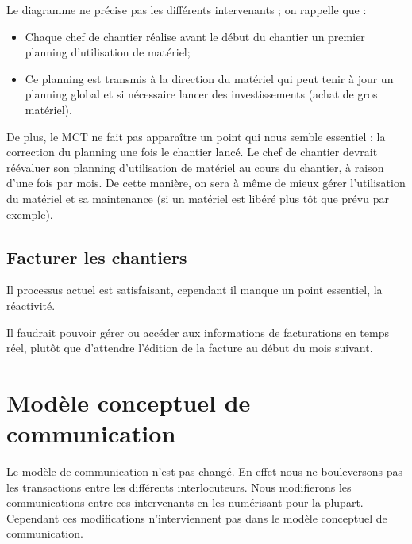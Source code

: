 \documentclass[twoside]{article}
\begin{document}
Le diagramme ne précise pas les différents intervenants ; on rappelle que :
\begin{itemize}
\item Chaque chef de chantier réalise avant le début du chantier un premier
planning d'utilisation de matériel;
\item Ce planning est transmis à la direction du matériel qui peut tenir à
jour un planning global et si nécessaire lancer des investissements (achat
de gros matériel).
\end{itemize}

\vskip 6pt

De plus, le MCT ne fait pas apparaître un point qui nous semble essentiel :
la correction du planning une fois le chantier lancé. Le chef de chantier
devrait réévaluer son planning d'utilisation de matériel au cours du
chantier, à raison d'une fois par mois. De cette manière, on sera à même de
mieux gérer l'utilisation du matériel et sa maintenance (si un matériel est
libéré plus tôt que prévu par exemple).


\subsection{Facturer les chantiers}

Il processus actuel est satisfaisant, cependant il manque un point essentiel,
la réactivité.

Il faudrait pouvoir gérer ou accéder aux informations de facturations en 
temps réel, plutôt que d’attendre l'édition de la facture au début du 
mois suivant.




\section{Modèle conceptuel de communication}

Le modèle de communication n'est pas changé. En effet nous ne bouleversons pas
les transactions entre les différents interlocuteurs. Nous modifierons les 
communications entre ces intervenants en les numérisant pour la plupart.
Cependant ces modifications n'interviennent pas dans le modèle conceptuel
de communication.

\end{document}
